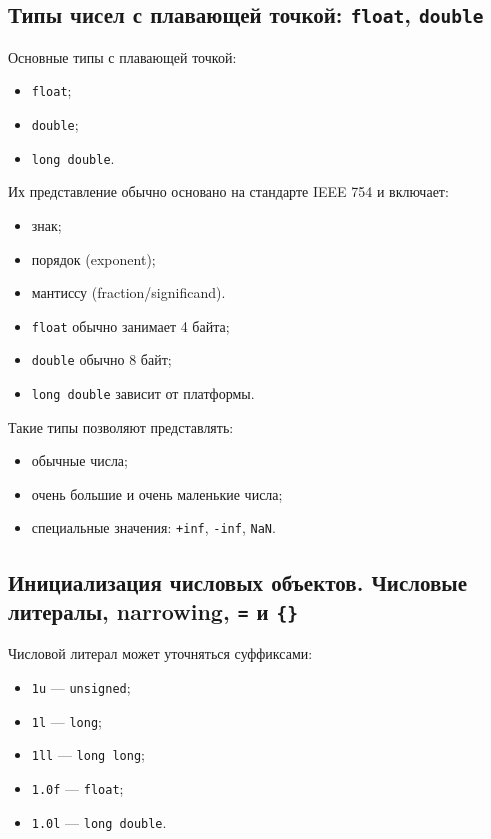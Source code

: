\subsection{Типы чисел с плавающей точкой: \texttt{float}, \texttt{double}}
Основные типы с плавающей точкой:
\begin{itemize}
    \item \texttt{float};
    \item \texttt{double};
    \item \texttt{long double}.
\end{itemize}

Их представление обычно основано на стандарте IEEE 754 и включает:
\begin{itemize}
    \item знак;
    \item порядок (exponent);
    \item мантиссу (fraction/significand).
\end{itemize}

\begin{itemize}
    \item \texttt{float} обычно занимает 4 байта;
    \item \texttt{double} обычно 8 байт;
    \item \texttt{long double} зависит от платформы.
\end{itemize}

Такие типы позволяют представлять:
\begin{itemize}
    \item обычные числа;
    \item очень большие и очень маленькие числа;
    \item специальные значения: \texttt{+inf}, \texttt{-inf}, \texttt{NaN}.
\end{itemize}

\subsection{Инициализация числовых объектов. Числовые литералы, narrowing, \texttt{=} и \texttt{\{\}}}
Числовой литерал может уточняться суффиксами:
\begin{itemize}
    \item \texttt{1u} — \texttt{unsigned};
    \item \texttt{1l} — \texttt{long};
    \item \texttt{1ll} — \texttt{long long};
    \item \texttt{1.0f} — \texttt{float};
    \item \texttt{1.0l} — \texttt{long double}.
\end{itemize}

